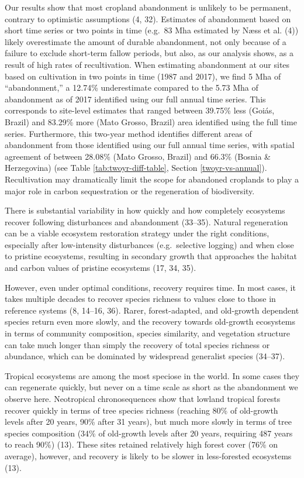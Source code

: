 \documentclass[9pt,twocolumn,twoside,lineno]{pnas-new}
\begin{document}
Our results show that most cropland abandonment is unlikely to be permanent, contrary to optimistic assumptions (4, 32).
Estimates of abandonment based on short time series or two points in time (e.g.~83 Mha estimated by Næss et al. (4)) likely overestimate the amount of durable abandonment, not only because of a failure to exclude short-term fallow periods, but also, as our analysis shows, as a result of high rates of recultivation.
When estimating abandonment at our sites based on cultivation in two points in time (1987 and 2017), we find 5 Mha of ``abandonment,'' a 12.74\% underestimate compared to the 5.73 Mha of abandonment as of 2017 identified using our full annual time series.
This corresponds to site-level estimates that ranged between 39.75\% less (Goiás, Brazil) and 83.29\% more (Mato Grosso, Brazil) area identified using the full time series.
Furthermore, this two-year method identifies different areas of abandonment from those identified using our full annual time series, with spatial agreement of between 28.08\% (Mato Grosso, Brazil) and 66.3\% (Bosnia \& Herzegovina) (see Table \ref{tab:twoyr-diff-table}, Section \ref{twoyr-vs-annual}).
Recultivation may dramatically limit the scope for abandoned croplands to play a major role in carbon sequestration or the regeneration of biodiversity.

There is substantial variability in how quickly and how completely ecosystems recover following disturbances and abandonment (33--35).
Natural regeneration can be a viable ecosystem restoration strategy under the right conditions, especially after low-intensity disturbances (e.g.~selective logging) and when close to pristine ecosystems, resulting in secondary growth that approaches the habitat and carbon values of pristine ecosystems (17, 34, 35).

However, even under optimal conditions, recovery requires time.
In most cases, it takes multiple decades to recover species richness to values close to those in reference systems (8, 14--16, 36).
Rarer, forest-adapted, and old-growth dependent species return even more slowly, and the recovery towards old-growth ecosystems in terms of community composition, species similarity, and vegetation structure can take much longer than simply the recovery of total species richness or abundance, which can be dominated by widespread generalist species (34--37).

Tropical ecosystems are among the most speciose in the world.
In some cases they can regenerate quickly, but never on a time scale as short as the abandonment we observe here.
Neotropical chronosequences show that lowland tropical forests recover quickly in terms of tree species richness (reaching 80\% of old-growth levels after 20 years, 90\% after 31 years), but much more slowly in terms of tree species composition (34\% of old-growth levels after 20 years, requiring 487 years to reach 90\%) (13).
These sites retained relatively high forest cover (76\% on average), however, and recovery is likely to be slower in less-forested ecosystems (13).
\end{document}
